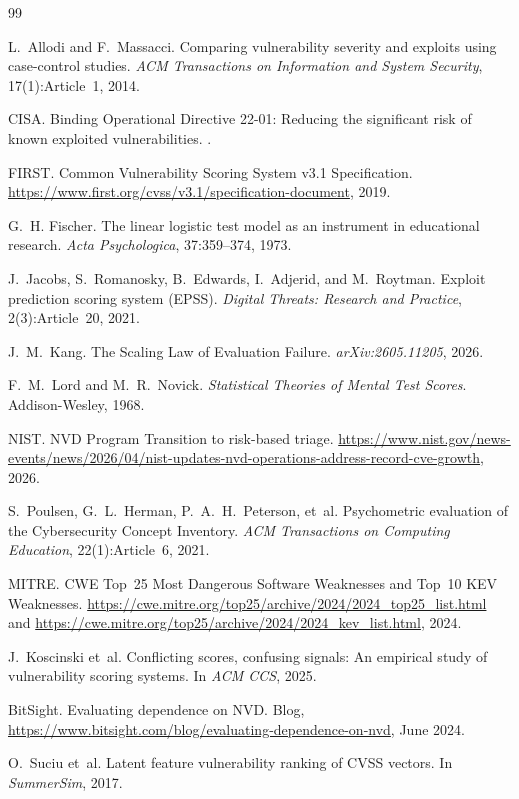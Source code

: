 \documentclass[11pt,a4paper]{article}
\begin{document}

\begin{thebibliography}{99}

L.~Allodi and F.~Massacci.
\newblock Comparing vulnerability severity and exploits using case-control studies.
\newblock \emph{ACM Transactions on Information and System Security}, 17(1):Article~1, 2014.

CISA.
\newblock Binding Operational Directive 22-01: Reducing the significant risk of known exploited vulnerabilities.
.

FIRST.
\newblock Common Vulnerability Scoring System v3.1 Specification.
\newblock \url{https://www.first.org/cvss/v3.1/specification-document}, 2019.

G.~H. Fischer.
\newblock The linear logistic test model as an instrument in educational research.
\newblock \emph{Acta Psychologica}, 37:359--374, 1973.

J.~Jacobs, S.~Romanosky, B.~Edwards, I.~Adjerid, and M.~Roytman.
\newblock Exploit prediction scoring system (EPSS).
\newblock \emph{Digital Threats: Research and Practice}, 2(3):Article~20, 2021.

J.~M.~Kang.
\newblock The Scaling Law of Evaluation Failure.
\newblock \emph{arXiv:2605.11205}, 2026.

F.~M.~Lord and M.~R.~Novick.
\newblock \emph{Statistical Theories of Mental Test Scores}.
\newblock Addison-Wesley, 1968.


NIST.
\newblock NVD Program Transition to risk-based triage.
\newblock \url{https://www.nist.gov/news-events/news/2026/04/nist-updates-nvd-operations-address-record-cve-growth}, 2026.

S.~Poulsen, G.~L.~Herman, P.~A.~H.~Peterson, et~al.
\newblock Psychometric evaluation of the Cybersecurity Concept Inventory.
\newblock \emph{ACM Transactions on Computing Education}, 22(1):Article~6, 2021.

MITRE.
 CWE Top~25 Most Dangerous Software Weaknesses and Top~10 KEV Weaknesses.
\newblock \url{https://cwe.mitre.org/top25/archive/2024/2024_top25_list.html} and \url{https://cwe.mitre.org/top25/archive/2024/2024_kev_list.html}, 2024.

J.~Koscinski et~al.
\newblock Conflicting scores, confusing signals: An empirical study of vulnerability scoring systems.
\newblock In \emph{ACM CCS}, 2025.

BitSight.
\newblock Evaluating dependence on NVD.
\newblock Blog, \url{https://www.bitsight.com/blog/evaluating-dependence-on-nvd}, June 2024.

O.~Suciu et~al.
\newblock Latent feature vulnerability ranking of CVSS vectors.
\newblock In \emph{SummerSim}, 2017.

\end{thebibliography}
\end{document}
